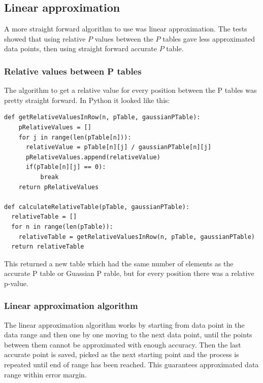 \documentclass[12pt]{article}
\begin{document}
\subsection{Linear approximation}

A more straight forward algorithm to use was linear approximation. The tests showed that using relative $P$ values between the $P$ tables gave less approximated data points, then using straight forward accurate $P$ table.

\subsubsection{Relative values between P tables}

The algorithm to get a relative value for every position between the P tables was pretty straight forward. In Python it looked like this:

\begin{verbatim}
def getRelativeValuesInRow(n, pTable, gaussianPTable):
    pRelativeValues = []
    for j in range(len(pTable[n])):
      relativeValue = pTable[n][j] / gaussianPTable[n][j]
      pRelativeValues.append(relativeValue)
      if(pTable[n][j] == 0):
          break
    return pRelativeValues

def calculateRelativeTable(pTable, gaussianPTable):
  relativeTable = []
  for n in range(len(pTable)):
    relativeTable = getRelativeValuesInRow(n, pTable, gaussianPTable)
  return relativeTable

\end{verbatim}

This returned a new table which had the same number of elements as the accurate P table or Guassian P rable, but for every position there was a relative p-value.

\subsubsection{Linear approximation algorithm}

The linear approximation algorithm works by starting from data point in the data range and then one by one moving to the next data point, until the points between them cannot be approximated with enough accuracy. Then the last accurate point is saved, picked as the next starting point and the process is repeated until end of range has been reached. This guarantees approximated data range within error margin.
\end{document}
